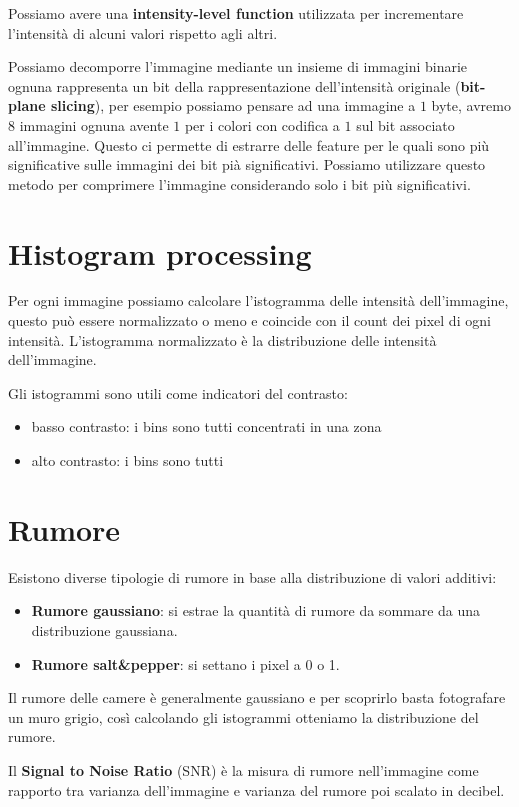 Possiamo avere una \textbf{intensity-level function} utilizzata per incrementare l'intensità
di alcuni valori rispetto agli altri.

Possiamo decomporre l'immagine mediante un insieme di immagini binarie ognuna
rappresenta un bit della rappresentazione dell'intensità originale (\textbf{bit-plane
    slicing}), per esempio possiamo pensare ad una immagine a $1$ byte, avremo
$8$ immagini ognuna avente $1$ per i colori con codifica a $1$ sul bit associato
all'immagine. Questo ci permette di estrarre delle feature per le quali sono più
significative sulle immagini dei bit pià significativi. Possiamo utilizzare
questo metodo per comprimere l'immagine considerando solo i bit più significativi.

\section{Histogram processing}
Per ogni immagine possiamo calcolare l'istogramma delle intensità dell'immagine,
questo può essere normalizzato o meno e coincide con il count dei pixel di ogni
intensità. L'istogramma normalizzato è la distribuzione delle intensità dell'immagine.

Gli istogrammi sono utili come indicatori del contrasto:
\begin{itemize}
    \item basso contrasto: i bins sono tutti concentrati in una zona
    \item alto contrasto: i bins sono tutti
\end{itemize}

\section{Rumore}
Esistono diverse tipologie di rumore in base alla distribuzione di valori additivi:
\begin{itemize}
    \item \textbf{Rumore gaussiano}: si estrae la quantità di rumore da sommare
          da una distribuzione gaussiana.
    \item \textbf{Rumore salt\&pepper}: si settano i pixel a 0 o 1.
\end{itemize}

Il rumore delle camere è generalmente gaussiano e per scoprirlo basta fotografare
un muro grigio, così calcolando gli istogrammi otteniamo la distribuzione del rumore.

Il \textbf{Signal to Noise Ratio} (SNR) è la misura di rumore nell'immagine come
rapporto tra varianza dell'immagine e varianza del rumore poi scalato in decibel.

